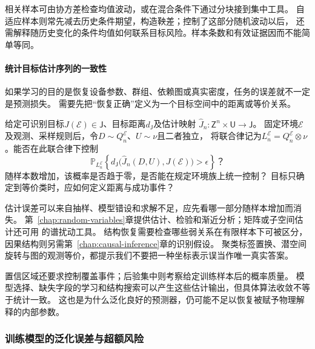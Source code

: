相关样本可由协方差检查均值波动，或在混合条件下通过分块接到集中工具。
自适应样本则常先减去历史条件期望，构造鞅差；控制了这部分随机波动以后，
还需解释随历史变化的条件均值如何联系目标风险。样本条数和有效证据因而不能简单等同。

\paragraph{统计目标估计序列的一致性}
\label{sec:future-analysis-statistical-recovery}

如果学习的目的是恢复设备参数、群组、依赖图或真实密度，任务的误差就不一定是预测损失。
需要先把“恢复正确”定义为一个目标空间中的距离或等价关系。

\begin{mathproblem}[估计映射的恢复误差与统计一致性]
  \label{question:future-statistical-recovery}
  给定可识别目标$J(\mathcal E)\in\mathsf J$、目标距离$d_{\mathsf J}$及估计映射
  $\widehat J_n:\mathsf Z^n\times\mathsf U\to\mathsf J$。
  固定环境$\mathcal E$及观测、采样规则后，令$D\sim Q_n^{\mathcal E}$、$U\sim\nu$且二者独立，
  将联合律记为$L_n^{\mathcal E}=Q_n^{\mathcal E}\otimes\nu$。能否在此联合律下控制
  \[
    \mathbb P_{L_n^{\mathcal E}}\!\left\{
      d_{\mathsf J}\bigl(\widehat J_n(D,U),J(\mathcal E)\bigr)>\epsilon
    \right\}\text{？}
  \]
  随样本数增加，该概率是否趋于零，是否能在规定环境族上统一控制？
  目标只确定到等价类时，应如何定义距离与成功事件？
\end{mathproblem}

估计误差可以来自抽样、模型错设和求解不足，应先看哪一部分随样本增加而消失。
第~\ref{chap:random-variables}章提供估计、检验和渐近分析；矩阵或子空间估计还可用
的谱扰动工具。
结构恢复需要检查哪些弱关系在有限样本下可被区分，因果结构则另需第~\ref{chap:causal-inference}章的识别假设。
聚类标签置换、潜空间旋转与图的观测等价，都提示我们不要把一种坐标表示误当作唯一真实答案。

置信区域还要求控制覆盖事件；后验集中则考察给定训练样本后的概率质量。
模型选择、缺失字段的学习和结构搜索可以产生这些估计输出，但具体算法收敛不等于统计一致。
这也是为什么泛化良好的预测器，仍可能不足以恢复被赋予物理解释的内部参数。

\subsubsection{训练模型的泛化误差与超额风险}
\label{sec:future-analysis-learned-risk}

